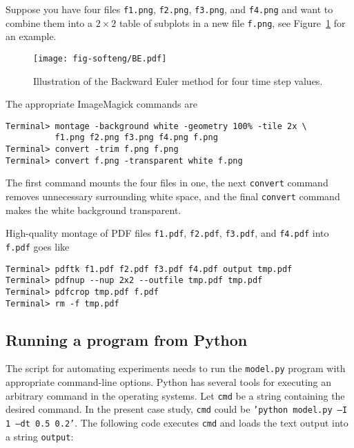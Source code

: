 \documentclass[graybox,sectrefs,envcountresetchap,open=right,final]{svmonodo}
\begin{document}
Suppose you have four files \texttt{f1.png}, \texttt{f2.png}, \texttt{f3.png}, and \texttt{f4.png}
and want to combine them into a $2\times 2$ table of subplots in a new
file \texttt{f.png}, see
Figure~\ref{softeng1:experiments:fig:BE4a} for an example.


\begin{figure}[!ht]  %
  \centerline{\texttt{[image: fig-softeng/BE.pdf]}}
  \caption{
  Illustration of the Backward Euler method for four time step values. \label{softeng1:experiments:fig:BE4a}
  }
\end{figure}


The appropriate ImageMagick commands are

\begin{Verbatim}[frame=lines,label=\fbox{{\tiny Terminal}},framesep=2.5mm,framerule=0.7pt,fontsize=\fontsize{9pt}{9pt}]
Terminal> montage -background white -geometry 100% -tile 2x \ 
          f1.png f2.png f3.png f4.png f.png
Terminal> convert -trim f.png f.png
Terminal> convert f.png -transparent white f.png
\end{Verbatim}
The first command mounts the four files in one, the next \texttt{convert} command
removes unnecessary surrounding white space, and the final \texttt{convert} command
makes the white background transparent.

High-quality montage of PDF files \texttt{f1.pdf},
\texttt{f2.pdf}, \texttt{f3.pdf}, and \texttt{f4.pdf} into \texttt{f.pdf} goes like

\begin{Verbatim}[frame=lines,label=\fbox{{\tiny Terminal}},framesep=2.5mm,framerule=0.7pt,fontsize=\fontsize{9pt}{9pt}]
Terminal> pdftk f1.pdf f2.pdf f3.pdf f4.pdf output tmp.pdf
Terminal> pdfnup --nup 2x2 --outfile tmp.pdf tmp.pdf
Terminal> pdfcrop tmp.pdf f.pdf
Terminal> rm -f tmp.pdf
\end{Verbatim}

\subsection{Running a program from Python}

The script for automating experiments needs to run the \texttt{model.py} program
with appropriate command-line options. Python has several tools for
executing an arbitrary command in the operating systems.
Let \texttt{cmd} be a string containing the desired command.
In the present case study, \texttt{cmd} could be \texttt{'python model.py --I 1 --dt 0.5 0.2'}.
The following code
executes \texttt{cmd} and loads the text output into a string \texttt{output}:
\end{document}
